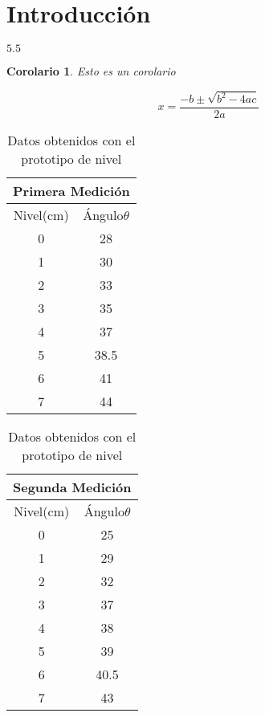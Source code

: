 \documentclass{IEEEtran}
\newtheorem{Corol}{Corolario}
\begin{document}
	
	\renewcommand{\contentsname}{Mi Indice}
	\tableofcontents
	\renewcommand{\listtablename}{Índice de Tablas} 
	\renewcommand{\tablename}{Tabla}
	\newpage
	\listoftables
	\newpage
	\section*{Introducción}
	$ 5.5 $
	
	\newcommand{\cuadratica}{
		\begin{equation}
		x=\frac{-b\pm \sqrt{b^2-4ac}}{2a}
		\end{equation}
	}
	
	\begin{Corol}
		Esto es un corolario \lipsum[1]
		\cuadratica
	\end{Corol}
	
	
	
	\lipsum[1-10]
	\begin{table}[h]
		\centering
		\begin{tabular}{|c|c|}
			\hline
			\multicolumn{2}{|c|}{Primera Medición}
			\\\hline
			Nivel(cm)&Ángulo$\theta$\\\hline
			0&28\\\hline
			1&30\\\hline
			2&33\\\hline
			3&35\\\hline
			4&37\\\hline
			5&38.5\\\hline
			6&41\\\hline
			7&44\\\hline
		\end{tabular}
		\hspace{1cm}
		\begin{tabular}{|c|c|}
			\hline
			\multicolumn{2}{|c|}{Segunda Medición}
			\\\hline
			Nivel(cm)&Ángulo$\theta$\\\hline
			0&25\\\hline
			1&29\\\hline
			2&32\\\hline
			3&37\\\hline
			4&38\\\hline
			5&39\\\hline
			6&40.5\\\hline
			7&43\\\hline
		\end{tabular}
		\caption{Datos obtenidos con el prototipo de nivel}
		\label{Tab:DPN}
	\end{table}
	
\end{document}
